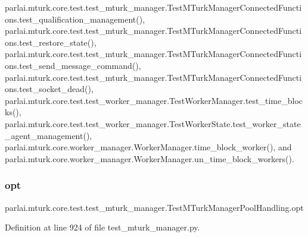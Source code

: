 parlai.\+mturk.\+core.\+test.\+test\+\_\+mturk\+\_\+manager.\+Test\+M\+Turk\+Manager\+Connected\+Functions.\+test\+\_\+qualification\+\_\+management(), parlai.\+mturk.\+core.\+test.\+test\+\_\+mturk\+\_\+manager.\+Test\+M\+Turk\+Manager\+Connected\+Functions.\+test\+\_\+restore\+\_\+state(), parlai.\+mturk.\+core.\+test.\+test\+\_\+mturk\+\_\+manager.\+Test\+M\+Turk\+Manager\+Connected\+Functions.\+test\+\_\+send\+\_\+message\+\_\+command(), parlai.\+mturk.\+core.\+test.\+test\+\_\+mturk\+\_\+manager.\+Test\+M\+Turk\+Manager\+Connected\+Functions.\+test\+\_\+socket\+\_\+dead(), parlai.\+mturk.\+core.\+test.\+test\+\_\+worker\+\_\+manager.\+Test\+Worker\+Manager.\+test\+\_\+time\+\_\+blocks(), parlai.\+mturk.\+core.\+test.\+test\+\_\+worker\+\_\+manager.\+Test\+Worker\+State.\+test\+\_\+worker\+\_\+state\+\_\+agent\+\_\+management(), parlai.\+mturk.\+core.\+worker\+\_\+manager.\+Worker\+Manager.\+time\+\_\+block\+\_\+worker(), and parlai.\+mturk.\+core.\+worker\+\_\+manager.\+Worker\+Manager.\+un\+\_\+time\+\_\+block\+\_\+workers().

\mbox{\label{classparlai_1_1mturk_1_1core_1_1test_1_1test__mturk__manager_1_1TestMTurkManagerPoolHandling_a4895fed88d427fecba80bfaeffdb4593}} 
\subsubsection{\texorpdfstring{opt}{opt}}
{\footnotesize\ttfamily parlai.\+mturk.\+core.\+test.\+test\+\_\+mturk\+\_\+manager.\+Test\+M\+Turk\+Manager\+Pool\+Handling.\+opt}



Definition at line 924 of file test\+\_\+mturk\+\_\+manager.\+py.



